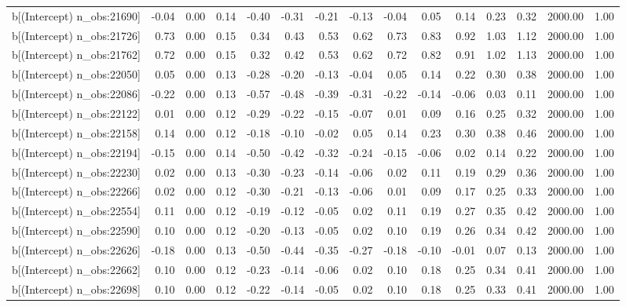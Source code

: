 \begin{table}[ht]
\begin{tabular}{rrrrrrrrrrrrrrr}
  b[(Intercept) n\_obs:21690] & -0.04 & 0.00 & 0.14 & -0.40 & -0.31 & -0.21 & -0.13 & -0.04 & 0.05 & 0.14 & 0.23 & 0.32 & 2000.00 & 1.00 \\ 
  b[(Intercept) n\_obs:21726] & 0.73 & 0.00 & 0.15 & 0.34 & 0.43 & 0.53 & 0.62 & 0.73 & 0.83 & 0.92 & 1.03 & 1.12 & 2000.00 & 1.00 \\ 
  b[(Intercept) n\_obs:21762] & 0.72 & 0.00 & 0.15 & 0.32 & 0.42 & 0.53 & 0.62 & 0.72 & 0.82 & 0.91 & 1.02 & 1.13 & 2000.00 & 1.00 \\ 
  b[(Intercept) n\_obs:22050] & 0.05 & 0.00 & 0.13 & -0.28 & -0.20 & -0.13 & -0.04 & 0.05 & 0.14 & 0.22 & 0.30 & 0.38 & 2000.00 & 1.00 \\ 
  b[(Intercept) n\_obs:22086] & -0.22 & 0.00 & 0.13 & -0.57 & -0.48 & -0.39 & -0.31 & -0.22 & -0.14 & -0.06 & 0.03 & 0.11 & 2000.00 & 1.00 \\ 
  b[(Intercept) n\_obs:22122] & 0.01 & 0.00 & 0.12 & -0.29 & -0.22 & -0.15 & -0.07 & 0.01 & 0.09 & 0.16 & 0.25 & 0.32 & 2000.00 & 1.00 \\ 
  b[(Intercept) n\_obs:22158] & 0.14 & 0.00 & 0.12 & -0.18 & -0.10 & -0.02 & 0.05 & 0.14 & 0.23 & 0.30 & 0.38 & 0.46 & 2000.00 & 1.00 \\ 
  b[(Intercept) n\_obs:22194] & -0.15 & 0.00 & 0.14 & -0.50 & -0.42 & -0.32 & -0.24 & -0.15 & -0.06 & 0.02 & 0.14 & 0.22 & 2000.00 & 1.00 \\ 
  b[(Intercept) n\_obs:22230] & 0.02 & 0.00 & 0.13 & -0.30 & -0.23 & -0.14 & -0.06 & 0.02 & 0.11 & 0.19 & 0.29 & 0.36 & 2000.00 & 1.00 \\ 
  b[(Intercept) n\_obs:22266] & 0.02 & 0.00 & 0.12 & -0.30 & -0.21 & -0.13 & -0.06 & 0.01 & 0.09 & 0.17 & 0.25 & 0.33 & 2000.00 & 1.00 \\ 
  b[(Intercept) n\_obs:22554] & 0.11 & 0.00 & 0.12 & -0.19 & -0.12 & -0.05 & 0.02 & 0.11 & 0.19 & 0.27 & 0.35 & 0.42 & 2000.00 & 1.00 \\ 
  b[(Intercept) n\_obs:22590] & 0.10 & 0.00 & 0.12 & -0.20 & -0.13 & -0.05 & 0.02 & 0.10 & 0.19 & 0.26 & 0.34 & 0.42 & 2000.00 & 1.00 \\ 
  b[(Intercept) n\_obs:22626] & -0.18 & 0.00 & 0.13 & -0.50 & -0.44 & -0.35 & -0.27 & -0.18 & -0.10 & -0.01 & 0.07 & 0.13 & 2000.00 & 1.00 \\ 
  b[(Intercept) n\_obs:22662] & 0.10 & 0.00 & 0.12 & -0.23 & -0.14 & -0.06 & 0.02 & 0.10 & 0.18 & 0.25 & 0.34 & 0.41 & 2000.00 & 1.00 \\ 
  b[(Intercept) n\_obs:22698] & 0.10 & 0.00 & 0.12 & -0.22 & -0.14 & -0.05 & 0.02 & 0.10 & 0.18 & 0.25 & 0.33 & 0.41 & 2000.00 & 1.00 \\ 

\end{tabular}
\end{table}
